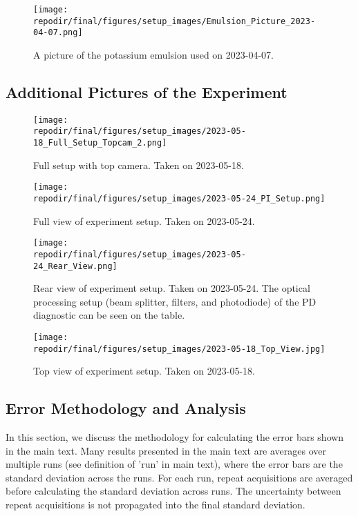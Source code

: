 \begin{figure}[]
\centering
\texttt{[image: \\repodir/final/figures/setup\_images/Emulsion\_Picture\_2023-04-07.png]}
\caption{A picture of the potassium emulsion used on 2023-04-07. }
\label{fig:SI_Emulsion_Picture}
\end{figure}

\clearpage
\subsection{Additional Pictures of the Experiment}

\begin{figure}[]
\centering
\texttt{[image: \\repodir/final/figures/setup\_images/2023-05-18\_Full\_Setup\_Topcam\_2.png]}
\caption{Full setup with top camera. Taken on 2023-05-18.}
\label{fig:SI_Full_Setup_Topcam}
\end{figure}

\begin{figure}[]
\centering
\texttt{[image: \\repodir/final/figures/setup\_images/2023-05-24\_PI\_Setup.png]}
\caption{Full view of experiment setup. Taken on 2023-05-24.}
\label{fig:SI_Full_Setup_PI}
\end{figure}


\begin{figure}[]
\centering
\texttt{[image: \\repodir/final/figures/setup\_images/2023-05-24\_Rear\_View.png]}
\caption{Rear view of experiment setup. Taken on 2023-05-24. The optical processing setup (beam splitter, filters, and photodiode) of the PD diagnostic can be seen on the table. }
\label{fig:SI_Rear_View}
\end{figure}

\begin{figure}[]
\centering
\texttt{[image: \\repodir/final/figures/setup\_images/2023-05-18\_Top\_View.jpg]}
\caption{Top view of experiment setup. Taken on 2023-05-18.}
\label{fig:SI_Top_View}
\end{figure}


\clearpage
\subsection{Error Methodology and Analysis}

In this section, we discuss the methodology for calculating the error bars shown in the main text. Many results presented in the main text are averages over multiple runs (see definition of 'run' in main text), where the error bars are the standard deviation across the runs. For each run, repeat acquisitions are averaged before calculating the standard deviation across runs. The uncertainty between repeat acquisitions is not propagated into the final standard deviation. 


